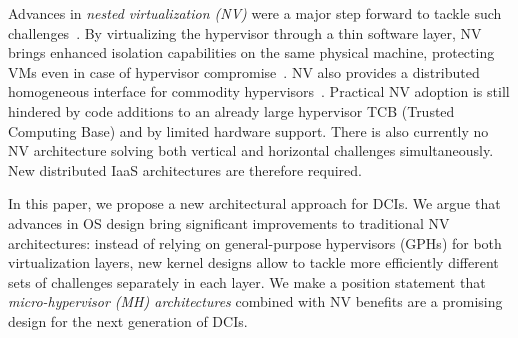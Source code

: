 \documentclass{sig-alternate}
\begin{document}
\newpage
Advances in \textit{nested virtualization (NV)} were a major step forward to tackle such challenges~\cite{turtle:ibm}. By virtualizing the hypervisor through a thin software layer, NV brings enhanced isolation capabilities on the same physical machine, protecting VMs even in case of hypervisor compromise~\cite{cloudvisor:zhang}. NV also provides a distributed homogeneous interface for commodity hypervisors~\cite{art:blan,xclo:blank}.
Practical NV adoption is still hindered by code additions to an already large hypervisor TCB (Trusted Computing Base) and by limited hardware support.  There is also currently no NV architecture solving both vertical and horizontal challenges simultaneously.
New distributed IaaS architectures are therefore required.


In this paper, we propose a new architectural approach for DCIs. We argue that advances in OS design bring significant improvements to traditional NV architectures: instead of relying on general-purpose hypervisors (GPHs) for both virtualization layers, new kernel designs allow to tackle more efficiently different sets of challenges separately in each layer. We make a position statement that \textit{micro-hypervisor (MH) architectures} combined with NV benefits are a promising design for the next generation of DCIs.
\end{document}

